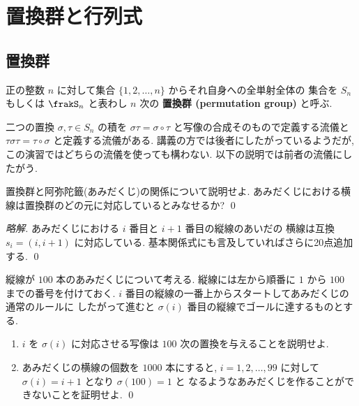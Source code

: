\documentclass[12pt,twoside]{jarticle}
\newcommand\commentout[1]{#1}
\newcommand\commentout[1]{}
\begin{document}

\section{置換群と行列式}


\subsection{置換群}

正の整数 $n$ に対して集合 $\{1,2,\ldots,n\}$ からそれ自身への全単射全体の
集合を $S_n$ もしくは $\frakS_n$ と表わし $n$ 次の
{\bf 置換群 (permutation group)} と呼ぶ.

二つの置換 $\sigma,\tau\in S_n$ の積を %
$\sigma\tau=\sigma\circ\tau$ と写像の合成そのもので定義する流儀と %
$\tau\sigma\tau=\tau\circ\sigma$ と定義する流儀がある.
講義の方では後者にしたがっているようだが, 
この演習ではどちらの流儀を使っても構わない.
以下の説明では前者の流儀にしたがう.

\begin{question}[10点]
  置換群と阿弥陀籤(あみだくじ)の関係について説明せよ. 
  あみだくじにおける横線は置換群のどの元に対応しているとみなせるか?
  \qed
\end{question}

\commentout{
\begin{proof}[略解]
  あみだくじにおける $i$ 番目と $i+1$ 番目の縦線のあいだの
  横線は互換 $s_i=(i,i+1)$ に対応している.
  基本関係式にも言及していればさらに20点追加する.
  \qed
\end{proof}
}

\begin{question}[15点]
  縦線が $100$ 本のあみだくじについて考える.
  縦線には左から順番に $1$ から $100$ までの番号を付けておく.
  $i$ 番目の縦線の一番上からスタートしてあみだくじの通常のルールに
  したがって進むと $\sigma(i)$ 番目の縦線でゴールに達するものとする.
  \begin{enumerate}
  \item 
    $i$ を $\sigma(i)$ に対応させる写像は $100$ 次の置換を与えることを説明せよ.
  \item
    あみだくじの横線の個数を $1000$ 本にすると, %
    $i=1,2,\ldots,99$ に対して $\sigma(i)=i+1$ となり $\sigma(100)=1$ と
    なるようなあみだくじを作ることができないことを証明せよ.
  \qed
  \end{enumerate}
\end{question}
\end{document}
